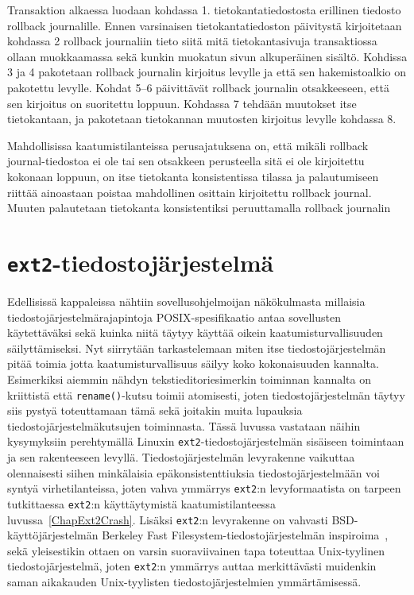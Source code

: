 Transaktion alkaessa luodaan kohdassa 1. tietokantatiedostosta erillinen tiedosto rollback journalille.
Ennen varsinaisen tietokantatiedoston päivitystä kirjoitetaan kohdassa 2 rollback journaliin tieto siitä mitä tietokantasivuja transaktiossa ollaan muokkaamassa sekä kunkin muokatun sivun alkuperäinen sisältö.
Kohdissa 3 ja 4 pakotetaan rollback journalin kirjoitus levylle ja että sen hakemistoalkio on pakotettu levylle.
Kohdat 5--6 päivittävät rollback journalin otsakkeeseen, että sen kirjoitus on suoritettu loppuun.
Kohdassa 7 tehdään muutokset itse tietokantaan, ja pakotetaan tietokannan muutosten kirjoitus levylle kohdassa 8.

Mahdollisissa kaatumistilanteissa perusajatuksena on,
että mikäli rollback journal-tiedostoa ei ole tai sen otsakkeen perusteella sitä ei ole kirjoitettu kokonaan loppuun,
on itse tietokanta konsistentissa tilassa ja palautumiseen riittää ainoastaan poistaa mahdollinen osittain kirjoitettu rollback journal.
Muuten palautetaan tietokanta konsistentiksi peruuttamalla rollback journalin 

\section{\texttt{ext2}-tiedostojärjestelmä}
\label{ChapExt2Fs}
Edellisissä kappaleissa nähtiin sovellusohjelmoijan näkökulmasta millaisia tiedostojärjestelmärajapintoja POSIX-spesifikaatio antaa sovellusten käytettäväksi sekä kuinka niitä täytyy käyttää oikein kaatumisturvallisuuden säilyttämiseksi.
Nyt siirrytään tarkastelemaan miten itse tiedostojärjestelmän pitää toimia jotta kaatumisturvallisuus säilyy koko kokonaisuuden kannalta.
Esimerkiksi aiemmin nähdyn tekstieditoriesimerkin toiminnan kannalta on kriittistä että \texttt{rename()}-kutsu toimii atomisesti,
joten tiedostojärjestelmän täytyy siis pystyä toteuttamaan tämä sekä joitakin muita lupauksia tiedostojärjestelmäkutsujen toiminnasta.
Tässä luvussa vastataan näihin kysymyksiin perehtymällä Linuxin \texttt{ext2}-tiedostojärjestelmän sisäiseen toimintaan ja sen rakenteeseen levyllä.
Tiedostojärjestelmän levyrakenne vaikuttaa olennaisesti siihen minkälaisia epäkonsistenttiuksia tiedostojärjestelmään voi syntyä virhetilanteissa,
joten vahva ymmärrys \texttt{ext2}:n levyformaatista on tarpeen tutkittaessa \texttt{ext2}:n käyttäytymistä kaatumistilanteessa luvussa~\ref{ChapExt2Crash}.
Lisäksi \texttt{ext2}:n levyrakenne on vahvasti BSD-käyttöjärjestelmän Berkeley Fast Filesystem-tiedostojärjestelmän inspiroima~\cite{Ext2Design},
sekä yleisestikin ottaen on varsin suoraviivainen tapa toteuttaa Unix-tyylinen tiedostojärjestelmä,
joten \texttt{ext2}:n ymmärrys auttaa merkittävästi muidenkin saman aikakauden Unix-tyylisten tiedostojärjestelmien ymmärtämisessä.

